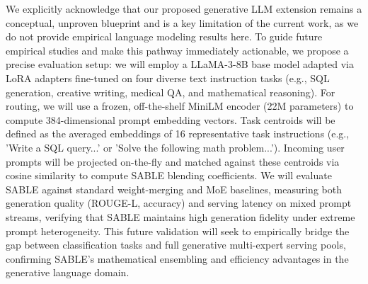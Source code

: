 We explicitly acknowledge that our proposed generative LLM extension remains a conceptual, unproven blueprint and is a key limitation of the current work, as we do not provide empirical language modeling results here. To guide future empirical studies and make this pathway immediately actionable, we propose a precise evaluation setup: we will employ a LLaMA-3-8B base model adapted via LoRA adapters fine-tuned on four diverse text instruction tasks (e.g., SQL generation, creative writing, medical QA, and mathematical reasoning). For routing, we will use a frozen, off-the-shelf MiniLM encoder (22M parameters) to compute 384-dimensional prompt embedding vectors. Task centroids will be defined as the averaged embeddings of 16 representative task instructions (e.g., 'Write a SQL query...' or 'Solve the following math problem...'). Incoming user prompts will be projected on-the-fly and matched against these centroids via cosine similarity to compute SABLE blending coefficients. We will evaluate SABLE against standard weight-merging and MoE baselines, measuring both generation quality (ROUGE-L, accuracy) and serving latency on mixed prompt streams, verifying that SABLE maintains high generation fidelity under extreme prompt heterogeneity. This future validation will seek to empirically bridge the gap between classification tasks and full generative multi-expert serving pools, confirming SABLE's mathematical ensembling and efficiency advantages in the generative language domain.

